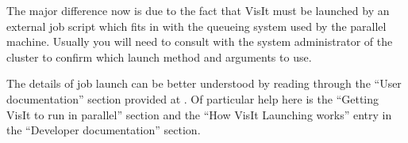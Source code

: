   The major difference now is due to the fact that VisIt must be launched
  by an external job script which fits in with the queueing system used
  by the parallel machine. Usually you will need to consult with the
  system administrator of the cluster to confirm which launch method and
  arguments to use.

  The details of job launch can be better understood by reading through the
  ``User documentation'' section provided at
  . 
  Of particular help here is the ``Getting VisIt to run in parallel'' section
  and the ``How VisIt Launching works'' entry in the
  ``Developer documentation'' section.
%
%


